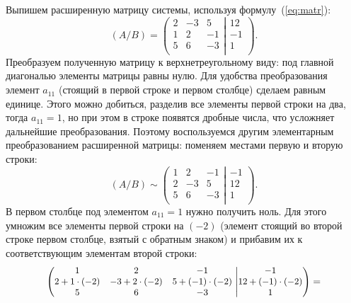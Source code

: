 \documentclass[10pt]{article}
\numberwithin{primer}{section}
\numberwithin{equation}{section}
\begin{document}
Выпишем расширенную матрицу системы, используя формулу~(\ref{eq:matr}):
\begin{equation*}
\left(A/B\right)=\left(\begin{matrix}
2 & -3 & 5 \\
1 & 2 & -1 \\
5 & 6 & -3 \\
\end{matrix}\right.\left|\begin{matrix}
12 \\
-1 \\
1 \\
\end{matrix}\right).
\end{equation*}
Преобразуем полученную матрицу к верхнетреугольному виду: под главной диагональю элементы матрицы равны нулю. Для
удобства преобразования элемент $a_{11}$ (стоящий в первой строке и первом столбце) сделаем равным единице. Этого
можно добиться, разделив все элементы первой строки на два, тогда $a_{11}=1$, но при этом в строке появятся дробные
числа, что усложняет дальнейшие преобразования. Поэтому воспользуемся другим элементарным преобразованием расширенной матрицы:
поменяем местами первую и вторую строки:
\begin{equation*}
\left(A/B\right)\sim\left(\begin{matrix}
1 & 2 & -1 \\
2 & -3 & 5 \\
5 & 6 & -3 \\
\end{matrix}\right.\left|\begin{matrix}
-1 \\
12 \\
1 \\
\end{matrix}\right).
\end{equation*}
В первом столбце под элементом $a_{11}=1$ нужно получить ноль. Для этого умножим все элементы первой строки на $(-2)$ (элемент
стоящий во второй строке  первом столбце, взятый с обратным знаком) и прибавим их к соответствующим элементам второй строки:
\begin{equation*}\small
\left(\begin{matrix}
1 & 2 & -1 \\
2+1\cdot(-2) & -3+2\cdot(-2) & 5+(-1)\cdot(-2) \\
5 & 6 & -3 \\
\end{matrix}\right.\left|\begin{matrix}
-1 \\
12+(-1)\cdot(-2) \\
1 \\
\end{matrix}\right)=
\end{equation*}
\end{document}

